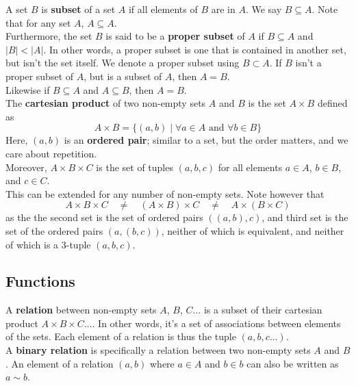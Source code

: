 \documentclass[12pt]{article}
\begin{document}
    A set $B$ is \textbf{subset} of a set $A$
    if all elements of $B$ are in $A$.
    We say $B \subseteq A$.
    Note that for any set $A$, $A \subseteq A$. \\
    Furthermore, the set $B$ is said to be a
    \textbf{proper subset} of $A$ if $B \subseteq A$
    and $|B| < |A|$.
    In other words, a proper subset is one that is
    contained in another set, but isn't the set itself.
    We denote a proper subset using $B \subset A$.
    If $B$ isn't a proper subset of $A$,
    but is a subset of $A$, then $A = B$. \\
    Likewise if $B \subseteq A$ and $A \subseteq B$,
    then $A = B$. \\

    The \textbf{cartesian product} of two non-empty sets $A$ and $B$
    is the set $A \times B$ defined as
    \[ A \times B = \{ (a, b) \mid
    \forall a \in A \text{ and } \forall b \in B \} \]
    Here, $(a, b)$ is an \textbf{ordered pair};
    similar to a set, but the order matters,
    and we care about repetition. \\
    Moreover, $A \times B \times C$
    is the set of tuples $(a, b, c)$
    for all elements $a \in A$, $b \in B$, and $c \in C$. \\
    This can be extended for any number of non-empty sets.
    Note however that
    \[ A \times B \times C \quad \neq \quad (A \times B) \times C 
    \quad \neq \quad A \times (B \times C) \]
    as the the second set is the set of
    ordered pairs $((a, b),  c)$,
    and third set is the set of
    the ordered pairs $(a, (b, c))$,
    neither of which is equivalent,
    and neither of which is a $3$-tuple $(a, b, c)$. \\


    \subsection*{Functions}

    A \textbf{relation} between non-empty sets
    $A$, $B$, $C \dots$ is a subset
    of their cartesian product $A \times B \times C \dots$.
    In other words, it's a set of associations between elements
    of the sets.
    Each element of a relation is thus the tuple $(a, b, c \dots)$. \\
    A \textbf{binary relation}
    is specifically a relation between two non-empty sets $A$ and $B$.
    An element of a relation $(a, b)$ where $a \in A$ and $b \in b$
    can also be written as $a \sim b$. \\
\end{document}
